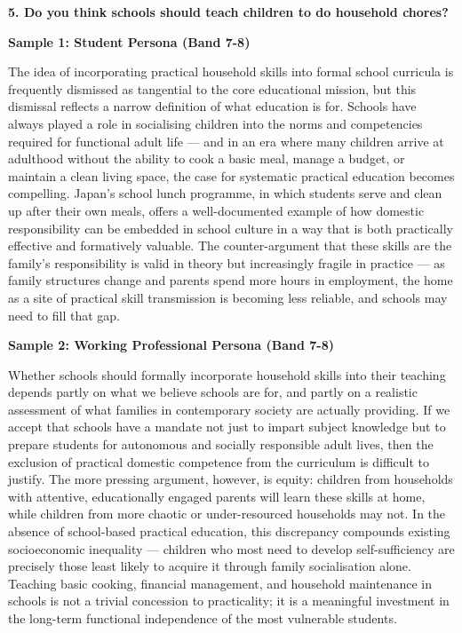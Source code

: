 \separator

\begin{ieltsquestion}
\textbf{5. Do you think schools should teach children to do household chores?}
\end{ieltsquestion}
\textbf{Sample 1: Student Persona (Band 7-8)}

The idea of incorporating practical household skills into formal school curricula is frequently dismissed as tangential to the core educational mission, but this dismissal reflects a narrow definition of what education is for. Schools have always played a role in socialising children into the norms and competencies required for functional adult life — and in an era where many children arrive at adulthood without the ability to cook a basic meal, manage a budget, or maintain a clean living space, the case for systematic practical education becomes compelling. Japan's school lunch programme, in which students serve and clean up after their own meals, offers a well-documented example of how domestic responsibility can be embedded in school culture in a way that is both practically effective and formatively valuable. The counter-argument that these skills are the family's responsibility is valid in theory but increasingly fragile in practice — as family structures change and parents spend more hours in employment, the home as a site of practical skill transmission is becoming less reliable, and schools may need to fill that gap.

\textbf{Sample 2: Working Professional Persona (Band 7-8)}

Whether schools should formally incorporate household skills into their teaching depends partly on what we believe schools are for, and partly on a realistic assessment of what families in contemporary society are actually providing. If we accept that schools have a mandate not just to impart subject knowledge but to prepare students for autonomous and socially responsible adult lives, then the exclusion of practical domestic competence from the curriculum is difficult to justify. The more pressing argument, however, is equity: children from households with attentive, educationally engaged parents will learn these skills at home, while children from more chaotic or under-resourced households may not. In the absence of school-based practical education, this discrepancy compounds existing socioeconomic inequality — children who most need to develop self-sufficiency are precisely those least likely to acquire it through family socialisation alone. Teaching basic cooking, financial management, and household maintenance in schools is not a trivial concession to practicality; it is a meaningful investment in the long-term functional independence of the most vulnerable students.

